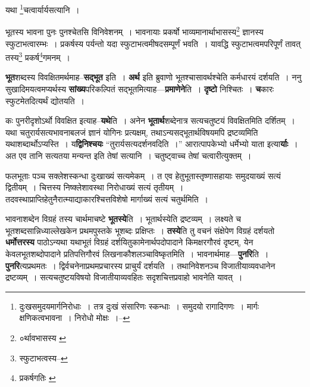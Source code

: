 \documentclass[article,12pt,a4paper]{memoir}
\begin{document}
	  \pstart यथा \footnote{दुःखसमुदयमार्गनिरोधाः । तत्र दुःखं संसारिणः स्कन्धाः । समुदयो रागादिगणः । मार्गः क्षणिकत्वभावना । निरोधो मोक्षः ।--\cite{dp-msD-n}}\-चत्वार्यार्यसत्यानि ।
	\pend
      
	  \bigskip
	  \begingroup
	

	  \pstart भूतस्य भावना पुनः पुनश्चेतसि विनिवेशनम् । भावनायाः प्रकर्षो भाव्यमानार्थाभासस्य\footnote{०र्थावभासस्य \cite{dp-msB} \cite{dp-edN}} ज्ञानस्य स्फुटाभत्वारम्भः । प्रकर्षस्य पर्यन्तो यदा स्फुटाभत्वमीषदसम्पूर्णं भवति । यावद्धि स्फुटाभत्वमपरिपूर्णं तावत् तस्य\footnote{स्फुटाभत्वस्य--\cite{dp-msD-n}} प्रकर्ष\footnote{प्रकर्षगतिः \cite{dp-msA} \cite{dp-edP} \cite{dp-edH} \cite{dp-edE} \cite{dp-edN}}\-गमनम् ।
	\pend
      
	  \endgroup
	

	  \pstart \textbf{भूत}शब्दस्य विवक्षितमर्थमाह--\textbf{सद्भूत} इति । \textbf{अर्थ} इति ब्रुवाणो भूतश्चासावर्थश्चेति कर्मधारयं दर्शयति । ननु सुखादिमयत्वमप्यर्थस्य \textbf{सांख्य}परिकल्पितं सद्भूतमित्याह—\textbf{प्रमाणेने}ति । \textbf{दृष्टो} निश्चितः । \textbf{च}कारः स्फुटमेतदित्यर्थं द्योतयति ।
	\pend
      

	  \pstart कः पुनरीदृशोऽर्थो विवक्षित इत्याह--\textbf{यथे}ति । अनेन \textbf{भूतार्थ}शब्देनात्र सत्यचतुष्टयं विवक्षितमिति दर्शितम् । यथा चतुरार्यसत्यभावनाबलजं ज्ञानं योगिनः प्रत्यक्षम्, तथाऽन्यसद्भूतार्थविषयमपि द्रष्टव्यमिति यथाशब्दार्थोऽप्यस्ति । य\textbf{द्विनिश्चयः} “तुरार्यसत्यदर्शनवदिति ।” आरात्पापकेभ्यो धर्मेभ्यो याता इत्या\textbf{र्याः} । अत एव तानि सत्यतया मन्यन्त इति तेषां सत्यानि । चतुष्ट्वाच्च तेषां चत्वारीत्युक्तम् ।
	\pend
      

	  \pstart फलभूताः पञ्च सक्लेशस्कन्धा दुःखाख्यं सत्यमेकम् । त एव हेतुभूतास्तृष्णासहायाः समुदयाख्यं सत्यं द्वितीयम् । चित्तस्य निष्क्लेशावस्था निरोधाख्यं सत्यं तृतीयम् । तदवस्थाप्राप्तिहेतुनैरात्म्याद्याकारश्चित्तविशेषो मार्गाख्यं सत्यं चतुर्थमिति ।
	\pend
      

	  \pstart भावनाशब्देन विग्रहं तस्य चार्थमाचष्टे \textbf{भूतस्ये}ति । भूतार्थस्येति द्रष्टव्यम् । लक्ष्यते च भूतशब्दसान्निध्याल्लेखकेन प्रथमपुस्तके भूशब्दः प्रक्षिप्तः । \textbf{तस्ये}ति तु वचनं संक्षेपेण विग्रहं दर्शयतो \textbf{धर्मोत्तरस्य} पाठोऽन्यथा यथाभूतं विग्रहं दर्शयितुकामेनार्थपदोपादाने किमक्षरगौरवं दृष्टम्, येन केवलभूतशब्दोपादाने प्रतिपत्तिगौरवं लिखनाकौशलञ्चाविष्कृतमिति । भावनार्थमाह—\textbf{पुनरि}ति । \textbf{पुनरि}त्यप्रथमतः । द्विर्वचनेनाप्रथमप्रचारस्य प्राचुर्यं दर्शयति । तथानिवेशनञ्च विजा\leavevmode{}तीयाव्यवधानेन द्रष्टव्यम् । सत्यचतुष्टयविषयो विजातीयाव्यवहितः सदृशचित्तप्रवाहो भावनेति यावत् ।
	\pend
	  \bigskip
	  \begingroup
	
\end{document}
